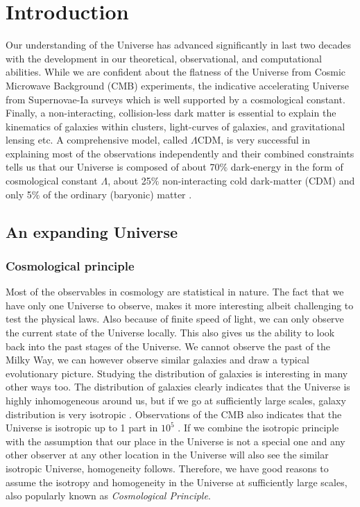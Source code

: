 \chapter{Introduction}\label{Introduction}

Our understanding of the Universe has advanced significantly in last two decades with the development in our 
theoretical, observational, and computational abilities. 
While we are confident about the flatness of the Universe from Cosmic Microwave 
Background (CMB) experiments, 
the indicative accelerating Universe from Supernovae-Ia surveys which is well supported
by a cosmological constant. Finally, a non-interacting, collision-less dark matter is essential 
to explain the kinematics of galaxies within clusters, light-curves of galaxies, and 
gravitational lensing etc. A comprehensive model, called $\Lambda$CDM,
is very successful in explaining most of the observations independently and their
combined constraints tells us that our Universe is composed of about 70$\%$
dark-energy in the form of cosmological constant $\Lambda$, about 25$\%$ non-interacting
cold dark-matter (CDM) and only 5$\%$ of the ordinary (baryonic) matter 
\citep{2015arXiv150201589P}. 


\section{An expanding Universe}

\subsection{Cosmological principle}

Most of the observables in cosmology are statistical in nature. 
The fact that we have only one Universe to observe,
makes it more interesting albeit challenging to test the physical laws. Also because 
of finite speed of light, we can only observe the current state of the Universe locally. 
This also gives us the ability to look back into the past stages of the Universe. 
We cannot observe the past of the Milky Way, we can however observe similar
galaxies and draw a typical evolutionary picture. Studying the distribution of galaxies is interesting in many other ways too. 
The distribution of galaxies clearly indicates that the Universe is highly 
inhomogeneous around us, but if we go at sufficiently large scales, 
galaxy distribution is very isotropic \citep{2012ApJS..203...21A,2015arXiv150100963A}.
Observations of the CMB also indicates 
that the Universe is isotropic up to 1 part in $10^{5}$ \citep{2011A&A...536A..19P}. 
If we combine the isotropic principle with the 
assumption that our place in the Universe is not a special one and any other observer
at any other location in the Universe will also see the similar isotropic Universe,
homogeneity follows. Therefore, we have good reasons to assume the isotropy 
and homogeneity in the Universe at sufficiently large scales, also popularly
known as {\it Cosmological Principle}.

